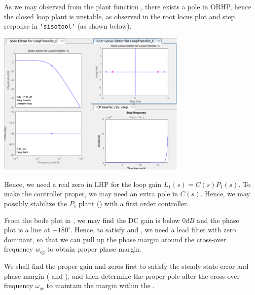 \documentclass{tron}
\begin{document}
	As we may observed from the plant function , there exists a pole in \Gls{ORHP}, hence the closed loop plant is unstable, as observed in the root locus plot and step response in \verb|'sisotool'| (as shown  below). 
	
	{	
		\centering
      	\includegraphics[width=350px]{Fig/sisotool-p1}
      	\par
    }
    
    Hence, we need a real zero in \Gls{LHP} for the loop gain $L_1(s) = C(s)P_1(s)$. To make the controller proper, we may need an extra pole in $C(s)$. Hence, we may possibly stabilize the $P_1$ plant () with a first order controller. 

	From the bode plot in , we may find the DC gain is below $0\unit{dB}$ and the phase plot is a line at $-180^\circ$. Hence, to satisfy  and , we need a lead filter with zero dominant, so that we can pull up the phase margin around the cross-over frequency $w_{cg}$ to obtain proper phase margin.
	
	We shall find the proper gain and zeros first to satisfy the steady state error and phase margin ( and ), and then determine the proper pole after the cross over frequency $\omega_{gc}$ to maintain the margin within the . 
		
\end{document}
